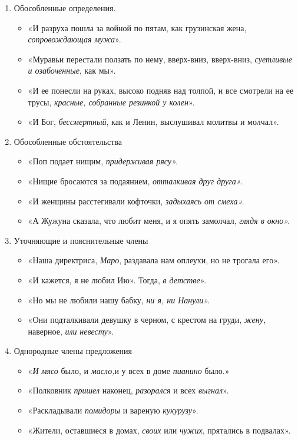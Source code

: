 \documentclass{kursa4}
\begin{document}
          \begin{enumerate}
            \item Обособленные определения. \begin{itemize}
              \item «И разруха пошла за войной по пятам, как грузинская жена, \textit{сопровождающая мужа}». \item «Муравьи перестали ползать по нему, вверх-вниз, вверх-вниз, \textit{суетливые и озабоченные}, как мы». \item «И ее понесли на руках, высоко подняв над толпой, и все смотрели на ее трусы, \textit{красные, собранные резинкой у колен}». \item «И Бог, \textit{бессмертный}, как и Ленин, выслушивал молитвы и молчал». \end{itemize}

            \item Обособленные обстоятельства \begin{itemize}
              \item «Поп подает нищим, \textit{придерживая рясу».}
              \item «Нищие бросаются за подаянием, \textit{отталкивая друг друга».}
              \item «И женщины расстегивали кофточки, \textit{задыхаясь от смеха».}
              \item «А Жужуна сказала, что любит меня, и я опять замолчал,\textit{
              глядя в окно».}
            \end{itemize}

            \item Уточняющие и пояснительные члены \begin{itemize}
              \item «Наша директриса, \textit{Маро}, раздавала нам оплеухи, но не трогала его». \item «И кажется, я не любил Ию». Тогда, \textit{в детстве}». \item «Но мы не любили нашу бабку, \textit{ни я, ни Нанули».}
              \item «Они подталкивали девушку в черном, с крестом на груди, \textit{жену,} наверное, \textit{или} \textit{невесту}». \end{itemize}
        
            \item Однородные члены предложения \begin{itemize}
              \item «\textit{И мясо} было, и \textit{масло,}и у всех в доме \textit{пианино} было.» 
              \item «Полковник \textit{пришел} наконец, \textit{разорался} и всех \textit{выгнал}». \item «Раскладывали \textit{помидоры} и вареную \textit{кукурузу}». \item «Жители, оставшиеся в домах, \textit{своих} или \textit{чужих}, прятались в подвалах». \end{itemize}
          \end{enumerate}
\end{document}
